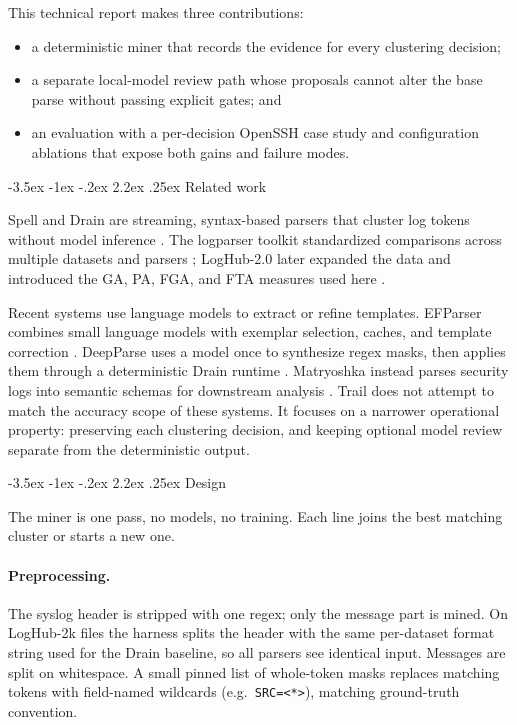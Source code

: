 \documentclass[11pt]{article}
\makeatletter
\newcommand{\wild}{\texttt{<*>}}
\renewcommand\section{\@startsection{section}{1}{\z@}%
  {-3.5ex \@plus -1ex \@minus -.2ex}%
  {2.2ex \@plus .25ex}%
  {\normalfont\Large\bfseries}}
\makeatother
\begin{document}
This technical report makes three contributions:
\begin{itemize}
\item a deterministic miner that records the evidence for every
clustering decision;
\item a separate local-model review path whose proposals cannot alter
the base parse without passing explicit gates; and
\item an evaluation with a per-decision OpenSSH case study and
configuration ablations that expose both gains and failure modes.
\end{itemize}

\section{Related work}
\label{sec:related}

Spell and Drain are streaming, syntax-based parsers that cluster log
tokens without model inference \cite{du2016, he2017}. The logparser
toolkit standardized comparisons across multiple datasets and parsers
\cite{zhu2019tools}; LogHub-2.0 later expanded the data and introduced
the GA, PA, FGA, and FTA measures used here \cite{jiang2024}.

Recent systems use language models to extract or refine templates.
EFParser combines small language models with exemplar selection,
caches, and template correction \cite{wang2026efparser}. DeepParse
uses a model once to synthesize regex masks, then applies them through
a deterministic Drain runtime \cite{shetaia2026deepparse}. Matryoshka
instead parses security logs into semantic schemas for downstream
analysis \cite{piet2025security}. Trail does not attempt to match the
accuracy scope of these systems. It focuses on a narrower operational
property: preserving each clustering decision, and keeping optional
model review separate from the deterministic output.

\section{Design}
\label{sec:design}

The miner is one pass, no models, no training. Each line joins the best
matching cluster or starts a new one.

\paragraph{Preprocessing.} The syslog header is stripped with one
regex; only the message part is mined. On LogHub-2k files the harness
splits the header with the same per-dataset format string used for the
Drain baseline, so all parsers see identical input. Messages are split
on whitespace. A small pinned list of whole-token masks replaces
matching tokens with field-named wildcards (e.g.\ \texttt{SRC=}\wild),
matching ground-truth convention.
\end{document}
